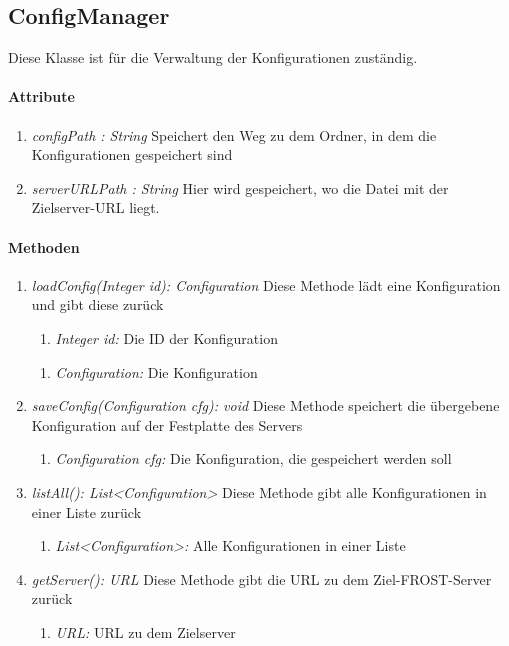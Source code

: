 
\subsection*{ConfigManager}\label{confman}
Diese Klasse ist für die Verwaltung der Konfigurationen zuständig.
\paragraph{Attribute}
\begin{enumerate}[-]
	\item \textit{configPath : String} Speichert den Weg zu dem Ordner, in dem die Konfigurationen gespeichert sind
	
	\item \textit{serverURLPath : String} Hier wird gespeichert, wo die Datei mit der Zielserver-URL liegt.		
\end{enumerate}

\paragraph{Methoden}
	
\begin{enumerate}[+]
	\item \textit{loadConfig(Integer id): Configuration} Diese Methode lädt eine Konfiguration und gibt diese zurück
		\begin{enumerate}[$\bullet$]
			\item \textit{Integer id:} Die ID der Konfiguration
		\end{enumerate}
		\vspace{-0.2cm}
		\begin{enumerate}[$\circ$]
			\item \textit{Configuration:} Die Konfiguration
		\end{enumerate}
	
	\item \textit{saveConfig(Configuration cfg): void} Diese Methode speichert die übergebene Konfiguration auf der Festplatte des Servers
	\begin{enumerate}[$\bullet$]
		\item \textit{Configuration cfg:} Die Konfiguration, die gespeichert werden soll
	\end{enumerate}
	
	\item \textit{listAll(): List<Configuration>} Diese Methode gibt alle Konfigurationen in einer Liste zurück	
	\begin{enumerate}[$\circ$]
		\item \textit{List<Configuration>:} Alle Konfigurationen in einer Liste
	\end{enumerate}
	
	\item \textit{getServer(): URL} Diese Methode gibt die URL zu dem Ziel-FROST-Server zurück
	\begin{enumerate}[$\circ$]
		\item \textit{URL:} URL zu dem Zielserver
	\end{enumerate}
\end{enumerate}
